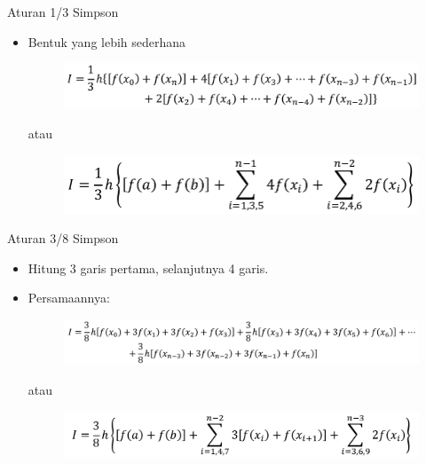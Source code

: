 \documentclass[pdflatex,compress,mathserif]{beamer}
\begin{document}
\begin{frame}{Aturan 1/3 Simpson}
    \begin{itemize}
        \item Bentuk yang lebih sederhana
        \begin{figure}
            \centering
            \includegraphics[width=\linewidth]{./img/img08.png}
        \end{figure}
        atau
        \begin{figure}
            \centering
            \includegraphics[width=\linewidth]{./img/img09.png}
        \end{figure}
    \end{itemize}
\end{frame}

\begin{frame}{Aturan 3/8 Simpson}
    \begin{itemize}
        \item Hitung 3 garis pertama, selanjutnya 4 garis.
        \item Persamaannya:
        \begin{figure}
            \centering
            \includegraphics[width=\linewidth]{./img/img10.png}
        \end{figure}
        atau
        \begin{figure}
            \centering
            \includegraphics[width=\linewidth]{./img/img11.png}
        \end{figure}
    \end{itemize}
\end{frame}
\end{document}
